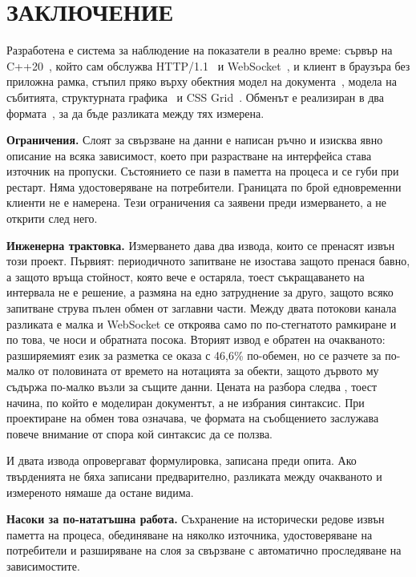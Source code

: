 \section*{ЗАКЛЮЧЕНИЕ}
\label{sec:conclusion}

Разработена е система за наблюдение на показатели в реално време: сървър на
C++20~\cite{iso_cpp20}, който сам обслужва HTTP/1.1~\cite{rfc9112} и
WebSocket~\cite{rfc6455}, и клиент в браузъра без приложна рамка, стъпил пряко върху
обектния модел на документа~\cite{dom_ls}, модела на събитията, структурната
графика~\cite{svg2} и CSS Grid~\cite{css_grid1}. Обменът е реализиран в два
формата~\cite{xml10,rfc8259}, за да бъде разликата между тях измерена.

\textbf{Ограничения.} Слоят за свързване на данни е написан ръчно и изисква явно описание
на всяка зависимост, което при разрастване на интерфейса става източник на пропуски.
Състоянието се пази в паметта на процеса и се губи при рестарт. Няма удостоверяване на
потребители. Границата по брой едновременни клиенти не е намерена. Тези ограничения са
заявени преди измерването, а не открити след него.

\textbf{Инженерна трактовка.} Измерването дава два извода, които се пренасят извън този
проект. Първият: периодичното запитване не изостава защото пренася бавно, а защото връща
стойност, която вече е остаряла, тоест съкращаването на интервала не е решение, а размяна на
едно затруднение за друго, защото всяко запитване струва пълен обмен от заглавни части.
Между двата потокови канала разликата е малка и WebSocket се откроява само по по-стегнатото
рамкиране и по това, че носи и обратната посока. Вторият извод е обратен на очакваното:
разширяемият език за разметка се оказа с 46,6\% по-обемен, но се разчете за по-малко от
половината от времето на нотацията за обекти, защото дървото му съдържа по-малко възли за
същите данни. Цената на разбора следва , тоест начина, по
който е моделиран документът, а не избрания синтаксис. При проектиране на обмен това
означава, че формата на съобщението заслужава повече внимание от спора кой синтаксис да се
ползва.

И двата извода опровергават формулировка, записана преди опита. Ако твърденията не бяха
записани предварително, разликата между очакваното и измереното нямаше да остане видима.

\textbf{Насоки за по-нататъшна работа.} Съхранение на исторически редове извън паметта на
процеса, обединяване на няколко източника, удостоверяване на потребители и разширяване на
слоя за свързване с автоматично проследяване на зависимостите.
